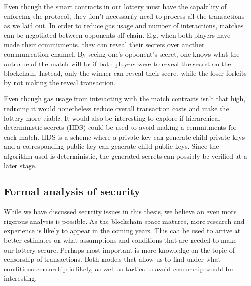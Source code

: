 Even though the smart contracts in our lottery must have the capability of enforcing the protocol, they don't necessarily need to process all the transactions as we laid out. In order to reduce gas usage and number of interactions, matches can be negotiated between opponents off-chain. E.g. when both players have made their commitments, they can reveal their secrets over another communication channel. By seeing one's opponent's secret, one knows what the outcome of the match will be if both players were to reveal the secret on the blockchain. Instead, only the winner can reveal their secret while the loser forfeits by not making the reveal transaction.

Even though gas usage from interacting with the match contracts isn't that high, reducing it would nonetheless reduce overall transaction costs and make the lottery more viable. It would also be interesting to explore if hierarchical deterministic secrets (HDS) could be used to avoid making a commitments for each match. HDS is a scheme where a private key can generate child private keys and a corresponding public key can generate child public keys. Since the algorithm used is deterministic, the generated secrets can possibly be verified at a later stage.

\subsection{Formal analysis of security}

While we have discussed security issues in this thesis, we believe an even more rigorous analysis is possible. As the blockchain space matures, more research and experience is likely to appear in the coming years. This can be used to arrive at better estimates on what assumptions and conditions that are needed to make our lottery secure. Perhaps most important is more knowledge on the topic of censorship of transactions. Both models that allow us to find under what conditions censorship is likely, as well as tactics to avoid censorship would be interesting.
